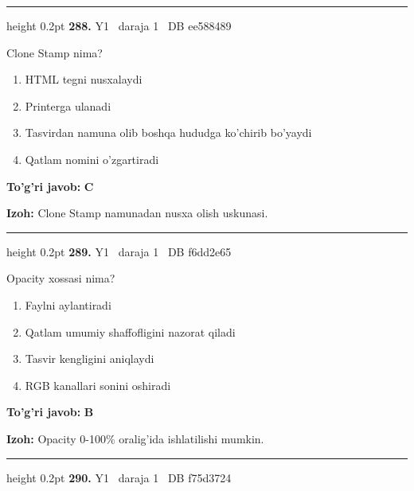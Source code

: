 \documentclass[10pt,a4paper,oneside]{article}
\begin{document}
\vspace{2mm}\hrule height 0.2pt \vspace{4mm}
\hypertarget{q288}{\textbf{\color{ink}288.}}  {\color{muted}\scriptsize Y1 \textbullet\ daraja 1 \textbullet\ DB ee588489}
\par
Clone Stamp nima?
\begin{enumerate}[label=\Alph*),leftmargin=9mm]
\item HTML tegni nusxalaydi
\item Printerga ulanadi
\item Tasvirdan namuna olib boshqa hududga ko'chirib bo'yaydi
\item Qatlam nomini o'zgartiradi
\end{enumerate}
\begin{tcolorbox}[enhanced,breakable,colback=teal!4,colframe=teal!45!black,boxrule=0.45pt,arc=1.2mm,left=2.8mm,right=2.8mm,top=2mm,bottom=2mm,before skip=2mm,after skip=2mm]
\textbf{\color{teal}To'g'ri javob:} \textbf{C}
\par\smallskip
\textbf{Izoh:} Clone Stamp namunadan nusxa olish uskunasi.
\end{tcolorbox}
\vspace{2mm}\hrule height 0.2pt \vspace{4mm}
\hypertarget{q289}{\textbf{\color{ink}289.}}  {\color{muted}\scriptsize Y1 \textbullet\ daraja 1 \textbullet\ DB f6dd2e65}
\par
Opacity xossasi nima?
\begin{enumerate}[label=\Alph*),leftmargin=9mm]
\item Faylni aylantiradi
\item Qatlam umumiy shaffofligini nazorat qiladi
\item Tasvir kengligini aniqlaydi
\item RGB kanallari sonini oshiradi
\end{enumerate}
\begin{tcolorbox}[enhanced,breakable,colback=teal!4,colframe=teal!45!black,boxrule=0.45pt,arc=1.2mm,left=2.8mm,right=2.8mm,top=2mm,bottom=2mm,before skip=2mm,after skip=2mm]
\textbf{\color{teal}To'g'ri javob:} \textbf{B}
\par\smallskip
\textbf{Izoh:} Opacity 0-100\% oralig'ida ishlatilishi mumkin.
\end{tcolorbox}
\vspace{2mm}\hrule height 0.2pt \vspace{4mm}
\hypertarget{q290}{\textbf{\color{ink}290.}}  {\color{muted}\scriptsize Y1 \textbullet\ daraja 1 \textbullet\ DB f75d3724}
\end{document}
